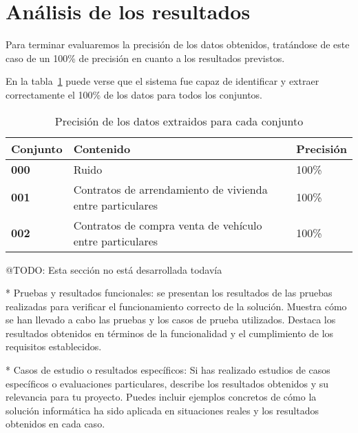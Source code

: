 \section{Análisis de los resultados}

Para terminar evaluaremos la precisión de los datos obtenidos, tratándose de este caso de un 100\% de precisión en
cuanto a los resultados previstos.

En la tabla~\ref{tab:data_set_performance} puede verse que el sistema fue capaz de identificar y extraer
correctamente el 100\% de los datos para todos los conjuntos.

\begin{table}[h]
    \renewcommand{\arraystretch}{1.5}
    \setlength{\tabcolsep}{10pt}
    \centering
    \begin{tabular}{>{\bfseries}p{} p{} p{}}
        \toprule
        \textbf{Conjunto} & \textbf{Contenido}                                        & \textbf{Precisión} \\
        \midrule
        \textbf{000}      & Ruido                                                     & 100\%              \\
        \textbf{001}      & Contratos de arrendamiento de vivienda entre particulares & 100\%              \\
        \textbf{002}      & Contratos de compra venta de vehículo entre particulares  & 100\%              \\
        \bottomrule
    \end{tabular}
    \caption{Precisión de los datos extraidos para cada conjunto}
    \label{tab:data_set_performance}
\end{table}

\colorbox{color_highlight}{@TODO: Esta sección no está desarrollada todavía}

* Pruebas y resultados funcionales: se presentan los resultados de las pruebas realizadas para verificar el
funcionamiento correcto de la solución.
Muestra cómo se han llevado a cabo las pruebas y los casos de prueba utilizados.
Destaca los resultados obtenidos en términos de la funcionalidad y el cumplimiento de los requisitos establecidos.

* Casos de estudio o resultados específicos: Si has realizado estudios de casos específicos o evaluaciones particulares,
describe los resultados obtenidos y su relevancia para tu proyecto. Puedes incluir ejemplos concretos de cómo la
solución informática ha sido aplicada en situaciones reales y los resultados obtenidos en cada caso.

